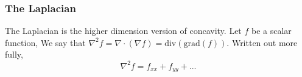 \subsubsection{The Laplacian}
The Laplacian is the higher dimension version of concavity. Let $f$ be a scalar function, We say that $\nabla^2 f=\nabla\cdot(\nabla f)=\text{div}(\text{grad}(f))$. Written out more fully,\\
$$\nabla^2 f = f_{xx}+f_{yy}+...$$